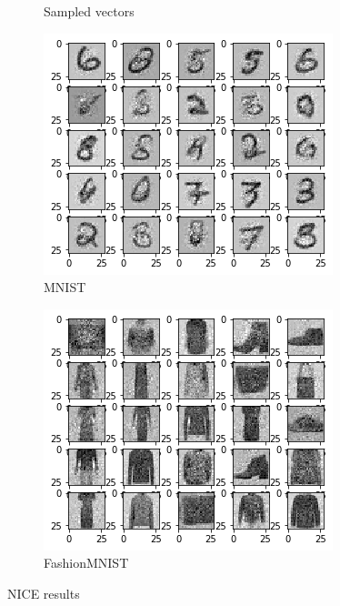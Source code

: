\begin{figure}[htbp!]
\begin{subfigure}[b]{0.3\textwidth}
         \caption{Sampled vectors}
         \label{fig:nice_results_sampled2}
     \end{subfigure} 
     \hfill
     \begin{subfigure}[b]{0.3\textwidth}
         \centering
         \includegraphics[width=\textwidth]{Images/mnist2.png}
         \caption{MNIST}
         \label{fig:nice_results_mnist2}
     \end{subfigure}
     \hfill
     \begin{subfigure}[b]{0.3\textwidth}
         \centering
         \includegraphics[width=\textwidth]{Images/fashion2.png}
         \caption{FashionMNIST}
         \label{fig:nice_results_fashion2}
     \end{subfigure}
        \caption{NICE results}
        \label{fig:nice_results}
\end{figure}
